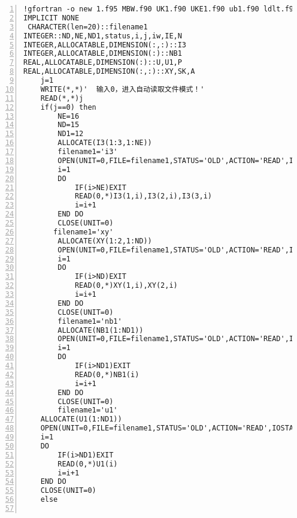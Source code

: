 \documentclass[hyperref,UTF-8]{ctexart}
\begin{document}
\begin{Verbatim}[numbers=left,commandchars=\\\{\},fontsize=\small,frame=single]
!gfortran -o new 1.f95 MBW.f90 UK1.f90 UKE1.f90 ub1.f90 ldlt.f90
IMPLICIT NONE
 CHARACTER(len=20)::filename1
INTEGER::ND,NE,ND1,status,i,j,iw,IE,N
INTEGER,ALLOCATABLE,DIMENSION(:,:)::I3
INTEGER,ALLOCATABLE,DIMENSION(:)::NB1
REAL,ALLOCATABLE,DIMENSION(:)::U,U1,P
REAL,ALLOCATABLE,DIMENSION(:,:)::XY,SK,A
	j=1
	WRITE(*,*)'  输入0，进入自动读取文件模式！'
	READ(*,*)j
	if(j==0) then
		NE=16
		ND=15
		ND1=12
		ALLOCATE(I3(1:3,1:NE))
		filename1='i3'
		OPEN(UNIT=0,FILE=filename1,STATUS='OLD',ACTION='READ',IOSTAT=status)
		i=1
		DO 
			IF(i>NE)EXIT	
			READ(0,*)I3(1,i),I3(2,i),I3(3,i)
			i=i+1
		END DO
		CLOSE(UNIT=0)
       filename1='xy'
		ALLOCATE(XY(1:2,1:ND))
		OPEN(UNIT=0,FILE=filename1,STATUS='OLD',ACTION='READ',IOSTAT=status)
		i=1
		DO 
			IF(i>ND)EXIT	
			READ(0,*)XY(1,i),XY(2,i)
			i=i+1
		END DO
		CLOSE(UNIT=0)
		filename1='nb1'
		ALLOCATE(NB1(1:ND1))
		OPEN(UNIT=0,FILE=filename1,STATUS='OLD',ACTION='READ',IOSTAT=status)
		i=1
		DO 
			IF(i>ND1)EXIT	
			READ(0,*)NB1(i)
			i=i+1
		END DO
		CLOSE(UNIT=0)
		filename1='u1'
	ALLOCATE(U1(1:ND1))
	OPEN(UNIT=0,FILE=filename1,STATUS='OLD',ACTION='READ',IOSTAT=status)
	i=1
	DO 
		IF(i>ND1)EXIT	
		READ(0,*)U1(i)
		i=i+1
	END DO
	CLOSE(UNIT=0)
	else
	

\end{Verbatim}
\end{document}
